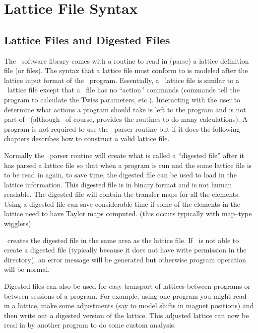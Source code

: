 \chapter{Lattice File Syntax}

\section{Lattice Files and Digested Files}
\label{s:lattice_files}

The \bmad\ software library comes with a routine to read in (parse) a
lattice definition file (or files). The syntax that a lattice file
must conform to is modeled after the lattice input format of the \mad\
program.  Essentially, a \bmad\ lattice file is similar to a \mad\
lattice file except that a \bmad\ file has no ``action'' commands
(commands tell the program to calculate the Twiss parameters,
etc.). Interacting with the user to determine what actions a program
should take is left to the program and is not part of \bmad\ (although
\bmad\, of course, provides the routines to do many calculations). A
program is not required to use the \bmad\ parser routine but if it
does the following chapters describes how to construct a valid lattice
file.

Normally the \bmad\ parser routine will create what is called a
``digested file'' after it has parsed a lattice file so that when a
program is run and the same lattice file is to be read in again, to save
time, the digested file can be used to load in the lattice information.
This digested file is in binary format and is not human readable. The
digested file will contain the transfer maps for all the elements. 
Using a digested file can save considerable time if some of the
elements in the lattice need to have Taylor maps computed.
(this occurs typically with map--type wigglers).

\bmad\ creates the digested file in the same area as the lattice file.
If \bmad\ is not able to create a digested file (typically because it
does not have write permission in the directory), an error message will
be generated but otherwise program operation will be normal.

Digested files can also be used for easy transport of lattices between
programs or between sessions of a program. For example, using one
program you might read in a lattice, make some adjustments (say to model
shifts in magnet positions) and then write out a digested version of the
lattice. This adjusted lattice can now be read in by another program to
do some custom analysis.

